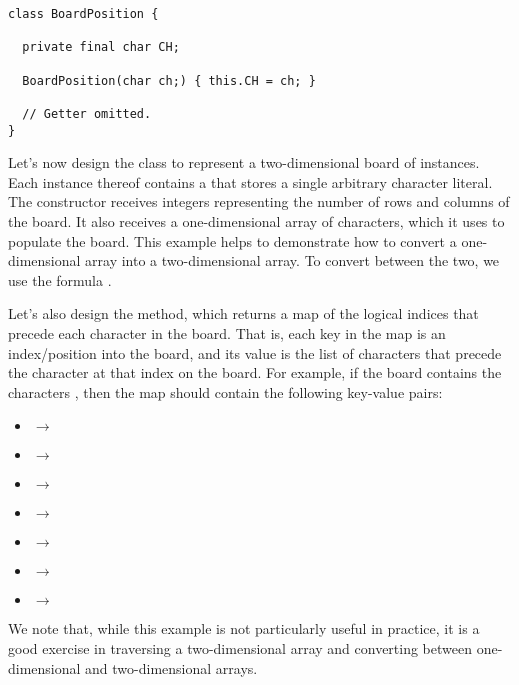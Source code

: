 
\begin{lstlisting}[language=MyJava]
class BoardPosition {

  private final char CH;

  BoardPosition(char ch;) { this.CH = ch; }

  // Getter omitted.
}
\end{lstlisting}

Let's now design the  class to represent a two-dimensional board of  instances.
Each instance thereof contains a  that stores a single arbitrary character literal.
The  constructor receives integers representing the number of rows and columns of the board.
It also receives a one-dimensional array of characters, which it uses to populate the board.
This example helps to demonstrate how to convert a one-dimensional array into a two-dimensional array.
To convert between the two, we use the formula .

Let's also design the  method, which returns a map of the logical indices that precede each character in the board.
That is, each key in the map is an index/position into the board, and its value is the list of characters that precede the character at that index on the board.
For example, if the board contains the characters , then the map should contain the following key-value pairs:

\begin{itemize}
  \item {} $\rightarrow$ \ttt{[]}
  \item {} $\rightarrow$ \ttt{[\q{}a\q{}]}
  \item {} $\rightarrow$ \ttt{[\q{}a\q{}]}
  \item {} $\rightarrow$ \ttt{[\q{}a\q{}, \q{}e\q{}]}
  \item {} $\rightarrow$ \ttt{[\q{}a\q{}, \q{}e\q{}]}
  \item {} $\rightarrow$ \ttt{[\q{}a\q{}, \q{}e\q{}, \q{}f\q{}]}
  \item {} $\rightarrow$ \ttt{[\q{}a\q{}, \q{}e\q{}, \q{}f\q{}]}
\end{itemize}

We note that, while this example is not particularly useful in practice, it is a good exercise in traversing a two-dimensional array and converting between one-dimensional and two-dimensional arrays.

